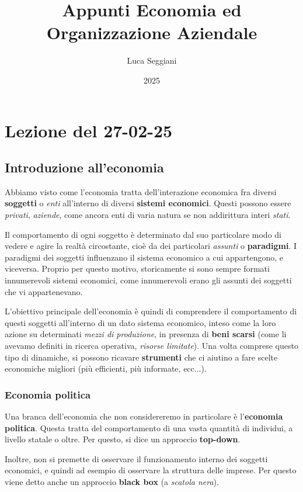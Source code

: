 \documentclass[a4paper,11pt]{article}
\title{Appunti Economia ed Organizzazione Aziendale}
\author{Luca Seggiani}
\date{2025}
\begin{document}
\section{Lezione del 27-02-25}

\thispagestyle{empty}
\pagestyle{fancy}

\subsection{Introduzione all'economia}
Abbiamo visto come l'economia tratta dell'interazione economica fra diversi \textbf{soggetti} o \textit{enti} all'interno di diversi \textbf{sistemi economici}.
Questi possono essere \textit{privati}, \textit{aziende}, come ancora enti di varia natura se non addirittura interi \textit{stati}.

Il comportamento di ogni soggetto è determinato dal suo particolare modo di vedere e agire la realtà circostante, cioè da dei particolari \textit{assunti} o \textbf{paradigmi}.
I paradigmi dei soggetti influenzano il sistema economico a cui appartengono, e viceversa.
Proprio per questo motivo, storicamente si sono sempre formati innumerevoli sistemi economici, come innumerevoli erano gli assunti dei soggetti che vi appartenevano.

L'obiettivo principale dell'economia è quindi di comprendere il comportamento di questi soggetti all'interno di un dato sistema economico, inteso come la loro azione su determinati \textit{mezzi di produzione}, in presenza di \textbf{beni scarsi} (come li avevamo definiti in ricerca operativa, \textit{risorse limitate}).
Una volta comprese questo tipo di dinamiche, si possono ricavare \textbf{strumenti} che ci aiutino a fare scelte economiche migliori (più efficienti, più informate, ecc...). 

\subsubsection{Economia politica}
Una branca dell'economia che non considereremo in particolare è l'\textbf{economia politica}.
Questa tratta del comportamento di una vasta quantità di individui, a livello statale o oltre.
Per questo, si dice un approccio \textbf{top-down}.

Inoltre, non si premette di osservare il funzionamento interno dei soggetti economici, e quindi ad esempio di osservare la struttura delle imprese.
Per questo viene detto anche un approccio \textbf{black box} (a \textit{scatola nera}).
\end{document}
